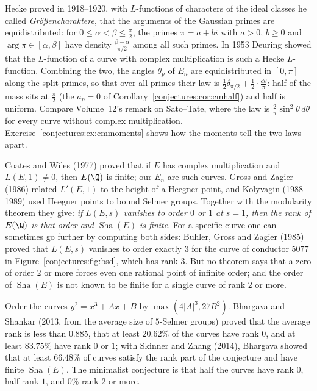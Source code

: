 \begin{remark}\label{conjectures:rem:hecke}
Hecke proved in 1918--1920, with $L$-functions of characters of the ideal classes he called \emph{Gr\"o\ss encharaktere}, that the arguments of the Gaussian
primes are equidistributed: for $0\le\alpha<\beta\le\frac\pi2$, the primes $\pi=a+bi$ with $a>0$, $b\ge0$ and $\arg\pi\in[\alpha,\beta]$ have density
$\frac{\beta-\alpha}{\pi/2}$ among all such primes. In 1953 Deuring showed that the $L$-function of a curve with complex multiplication is such a Hecke
$L$-function. Combining the two, the angles $\theta_p$ of $E_n$ are equidistributed in $[0,\pi]$ along the split primes, so that over all primes their law is
$\frac12\delta_{\pi/2}+\frac12\cdot\frac{d\theta}\pi$: half of the mass sits at $\frac\pi2$ (the $a_p=0$ of Corollary~\ref{conjectures:cor:cmhalf}) and half is uniform.
Compare Volume~12's remark on Sato--Tate, where the law is $\frac2\pi\sin^2\theta\,d\theta$ for every curve without complex multiplication.
Exercise~\ref{conjectures:ex:cmmoments} shows how the moments tell the two laws apart.
\end{remark}

\begin{remark}\label{conjectures:rem:bsdproved}
Coates and Wiles (1977) proved that if $E$ has complex multiplication and $L(E,1)\ne0$, then $E(\Q)$ is finite; our $E_n$ are such curves. Gross and Zagier
(1986) related $L'(E,1)$ to the height of a Heegner point, and Kolyvagin (1988--1989) used Heegner points to bound Selmer groups. Together with the modularity
theorem they give: \emph{if $L(E,s)$ vanishes to order $0$ or $1$ at $s=1$, then the rank of $E(\Q)$ is that order and $\operatorname{Sha}(E)$ is finite}. For a specific curve
one can sometimes go further by computing both sides: Buhler, Gross and Zagier (1985) proved that $L(E,s)$ vanishes to order exactly $3$ for the curve of
conductor $5077$ in Figure~\ref{conjectures:fig:bsd}, which has rank $3$. But no theorem says that a zero of order $2$ or more forces even one rational point of
infinite order; and the order of $\operatorname{Sha}(E)$ is not known to be finite for a single curve of rank $2$ or more.
\end{remark}

\begin{remark}[on average]\label{conjectures:rem:averages}
Order the curves $y^2=x^3+Ax+B$ by $\max(4|A|^3,27B^2)$. Bhargava and Shankar (2013, from the average size of $5$-Selmer groups) proved that the average rank
is less than $0.885$, that at least $20.62\%$ of the curves have rank $0$, and at least $83.75\%$ have rank $0$ or $1$; with Skinner and Zhang (2014), Bhargava
showed that at least $66.48\%$ of curves satisfy the rank part of the conjecture and have finite $\operatorname{Sha}(E)$. The minimalist conjecture is that half the curves have
rank $0$, half rank $1$, and $0\%$ rank $2$ or more.
\end{remark}

